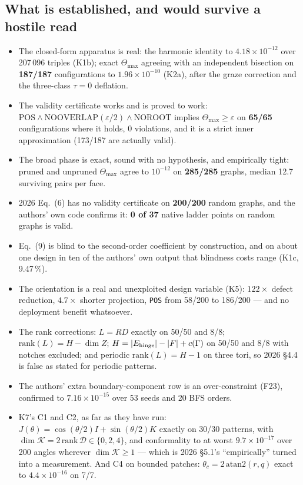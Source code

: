 \documentclass[10pt,a4paper]{article}
\begin{document}
\subsection{What is established, and would survive a hostile read}

\begin{itemize}[nosep,leftmargin=5mm]
\item The closed-form apparatus is real: the harmonic identity to $4.18\times10^{-12}$ over
207\,096 triples (K1b); exact $\Theta_{\max}$ agreeing with an independent bisection on
\textbf{187/187} configurations to $1.96\times10^{-10}$ (K2a), after the graze correction and the
three-class $\tau=0$ deflation.
\item The validity certificate works and is proved to work:
$\mathrm{POS}\wedge\mathrm{NOOVERLAP}(\varepsilon/2)\wedge\mathrm{NOROOT}$ implies
$\Theta_{\max}\ge\varepsilon$ on \textbf{65/65} configurations where it holds, 0 violations, and
it is a strict inner approximation (173/187 are actually valid).
\item The broad phase is exact, sound with no hypothesis, and empirically tight: pruned and
unpruned $\Theta_{\max}$ agree to $10^{-12}$ on \textbf{285/285} graphs, median 12.7 surviving
pairs per face.
\item 2026 Eq.~(6) has no validity certificate on \textbf{200/200} random graphs, and the
authors' own code confirms it: \textbf{0 of 37} native ladder points on random graphs is valid.
\item Eq.~(9) is blind to the second-order coefficient by construction, and on about one design
in ten of the authors' own output that blindness costs range (K1c, 9.47\,\%).
\item The orientation is a real and unexploited design variable (K5): $122\times$ defect
reduction, $4.7\times$ shorter projection, \texttt{POS} from 58/200 to 186/200 --- and no
deployment benefit whatsoever.
\item The rank corrections: $L = RD$ exactly on 50/50 and 8/8; $\mathrm{rank}(L) = H - \dim Z$;
$H = |E_{\rm hinge}| - |F| + c(\Gamma)$ on 50/50 and 8/8 with notches excluded; and periodic
$\mathrm{rank}(L) = H-1$ on three tori, so 2026 \S4.4 is false as stated for periodic patterns.
\item The authors' extra boundary-component row is an over-constraint (F23), confirmed to
$7.16\times10^{-15}$ over 53 seeds and 20 BFS orders.
\item K7's C1 and C2, as far as they have run: $J(\theta) = \cos(\theta/2)I+\sin(\theta/2)K$
exactly on 30/30 patterns, with $\dim\mathcal K = 2\,\mathrm{rank}\,\mathcal D \in\{0,2,4\}$, and
conformality to at worst $9.7\times10^{-17}$ over 200 angles wherever $\dim\mathcal K\ge1$ ---
which is 2026 \S5.1's ``empirically'' turned into a measurement. And C4 on bounded patches:
$\theta_c = 2\,\mathrm{atan2}(r,q)$ exact to $4.4\times10^{-16}$ on 7/7.
\end{itemize}
\end{document}
